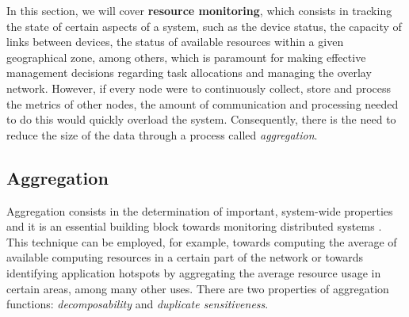 



In this section, we will cover \textbf{resource monitoring}, which consists in tracking the state of certain aspects of a system, such as the device status, the capacity of links between devices, the status of available resources within a given geographical zone, among others, which is paramount for making effective management decisions regarding task allocations and managing the overlay network. However, if every node were to continuously collect, store and process the metrics of other nodes, the amount of communication and processing needed to do this would quickly overload the system. Consequently, there is the need to reduce the size of the data through a process called \textit{aggregation}.

\subsection{Aggregation}

Aggregation consists in the determination of important, system-wide properties and it is an essential building block towards monitoring distributed systems \cite{8613952} \cite{DBLP:journals/corr/abs-1110-0725}. This technique can be employed, for example, towards computing the average of available computing resources in a certain part of the network or towards identifying application hotspots by aggregating the average resource usage in certain areas, among many other uses. There are two properties of aggregation functions: \textit{decomposability} and \textit{duplicate sensitiveness}.

